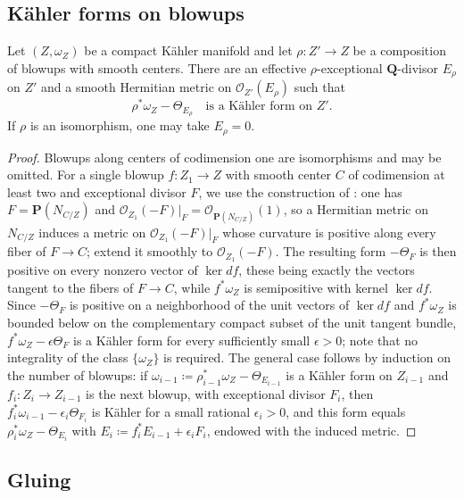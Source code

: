 \subsection{K\"ahler forms on blowups}

\begin{lemma}\label{nk:lem:exceptional-metric}
Let $(Z,\omega_Z)$ be a compact K\"ahler manifold and let
$\rho\colon Z'\to Z$ be a composition of blowups with smooth centers.
There are an effective $\rho$-exceptional $\mathbf Q$-divisor $E_\rho$
on $Z'$ and a smooth Hermitian metric on $\mathcal O_{Z'}(E_\rho)$ such that
\[
  \rho^*\omega_Z-\Theta_{E_\rho}\quad\text{is a K\"ahler form on }Z'.
\]
If $\rho$ is an isomorphism, one may take $E_\rho=0$.
\end{lemma}

\begin{proof}
Blowups along centers of codimension one are isomorphisms and may be
omitted. For a single blowup $f\colon Z_1\to Z$ with smooth center
$C$ of codimension at least two and exceptional divisor $F$, we use
the construction of
\cite[Chapter~VII, Proposition~12.4 and its proof]{DemCADG}: one has
$F=\mathbf P(N_{C/Z})$ and
$\mathcal O_{Z_1}(-F)|_F=\mathcal O_{\mathbf P(N_{C/Z})}(1)$, so a Hermitian metric on
$N_{C/Z}$ induces a metric on $\mathcal O_{Z_1}(-F)|_F$ whose curvature is
positive along every fiber of $F\to C$; extend it smoothly to
$\mathcal O_{Z_1}(-F)$. The resulting form $-\Theta_F$ is then positive on
every nonzero vector of $\ker df$, these being exactly the vectors
tangent to the fibers of $F\to C$, while $f^*\omega_Z$ is
semipositive with kernel $\ker df$. Since $-\Theta_F$ is positive on
a neighborhood of the unit vectors of $\ker df$ and $f^*\omega_Z$ is
bounded below on the complementary compact subset of the unit tangent
bundle, $f^*\omega_Z-\epsilon\Theta_F$ is a K\"ahler form for every
sufficiently small $\epsilon>0$; note that no integrality of the class
$\{\omega_Z\}$ is required. The general case follows by induction on
the number of blowups: if
$\omega_{i-1}\coloneqq \rho_{i-1}^*\omega_Z-\Theta_{E_{i-1}}$ is a K\"ahler
form on $Z_{i-1}$ and $f_i\colon Z_i\to Z_{i-1}$ is the next blowup,
with exceptional divisor $F_i$, then
$f_i^*\omega_{i-1}-\epsilon_i\Theta_{F_i}$ is K\"ahler for a small
rational $\epsilon_i>0$, and this form equals
$\rho_i^*\omega_Z-\Theta_{E_i}$ with
$E_i\coloneqq f_i^*E_{i-1}+\epsilon_iF_i$, endowed with the induced metric.
\end{proof}

\subsection{Gluing}

